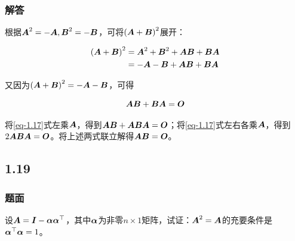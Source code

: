 \documentclass{beamer}
\begin{document}
\begin{frame}
\frametitle{解答}

    根据\(\mata^2=-\mata,\matb^2=-\matb\)，可将\(\mypar{\mata+\matb}^2\)展开：

    \begin{align*}
        \mypar{\mata+\matb}^2 & =\mata^2+\matb^2+\mata\matb+\matb\mata \\
                              & =-\mata-\matb+\mata\matb+\matb\mata
    \end{align*}

    又因为\(\mypar{\mata+\matb}^2=-\mata-\matb\)，可得

    \begin{equation}\label{eq-1.17}
        \mata\matb+\matb\mata=\mato
    \end{equation}

    将\eqref{eq-1.17}式左乘\(\mata\)，得到\(\mata\matb+\mata\matb\mata=\mato\)；将\eqref{eq-1.17}式左右各乘\(\mata\)，得到\(2\mata\matb\mata=\mato\)。将上述两式联立解得\(\mata\matb=\mato\)。

\end{frame}

\subsection*{1.19}

\begin{frame}
\frametitle{题面}

设\(\mata=\mati-\vecal\vecal^\top\)，其中\(\vecal\)为非零\(n\times1\)矩阵，试证：\(\mata^2=\mata\)的充要条件是\(\vecal^\top\vecal=1\)。

\end{frame}
\end{document}
